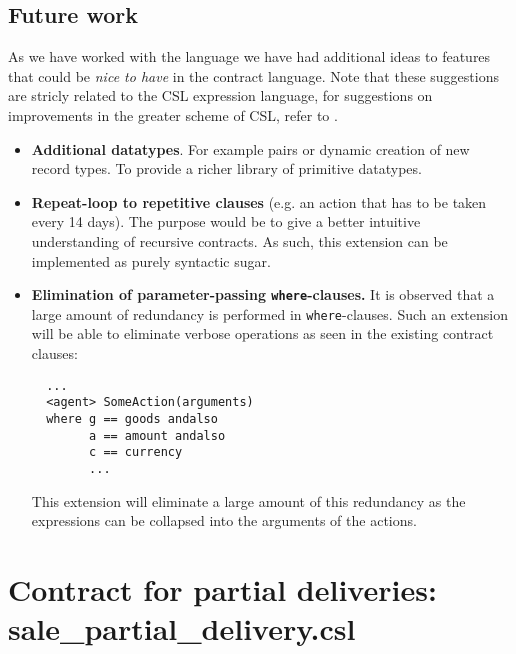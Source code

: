 \documentclass[10pt,a4paper,final,oneside,openany,article]{memoir}
\begin{document}
\section{Future work}
As we have worked with the language we have had additional ideas to
features that could be \textit{nice to have} in the contract language.
Note that these suggestions are stricly related to the CSL expression
language, for suggestions on improvements in the greater scheme of CSL,
refer to \cite{hvitved10}.
\begin{itemize}
\item \textbf{Additional datatypes}. For example pairs or dynamic
  creation of new record types. To provide a richer library of primitive
  datatypes.
\item \textbf{Repeat-loop to repetitive clauses} (e.g. an action that
  has to be taken every 14 days). The purpose would be to give a better
  intuitive understanding of recursive contracts. As such, this
  extension can be implemented as purely syntactic sugar.
\item \textbf{Elimination of parameter-passing \lstinline{where}-clauses.} It is
  observed that a large amount of redundancy is performed in
  \lstinline{where}-clauses. Such an extension will be able to eliminate
  verbose operations as seen in the existing contract clauses:
  \begin{lstlisting}
  ...
  <agent> SomeAction(arguments)
  where g == goods andalso
        a == amount andalso
        c == currency
        ...
  \end{lstlisting}
  This extension will eliminate a large amount of this redundancy as
  the expressions can be collapsed into the arguments of the actions.
\end{itemize}

\printbibliography


\newpage
    \appendix
\chapter{Contract for partial deliveries: sale\_partial\_delivery.csl}
\label{chap:sale_partial_delivery}

\end{document}
